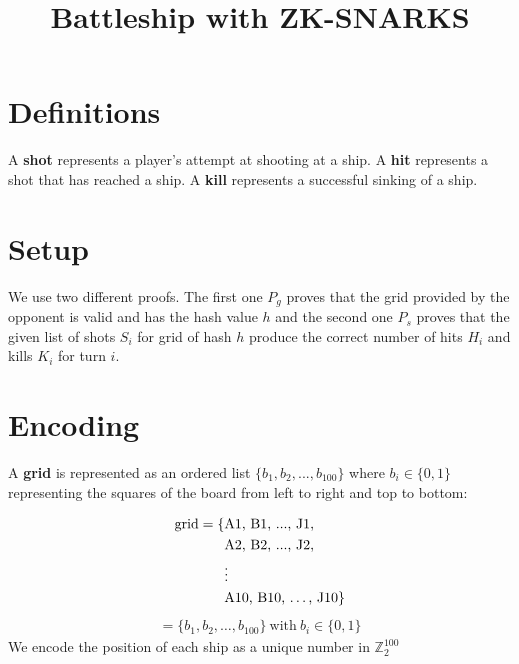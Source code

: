 \documentclass{article}
\title{Battleship with ZK-SNARKS}
\begin{document}
\maketitle
\section{Definitions}
A \textbf{shot} represents a player's attempt at shooting at a ship. A \textbf{hit} represents a shot that has reached a ship. A \textbf{kill} represents a successful sinking of a ship.
\section{Setup}
We use two different proofs. The first one $P_g$ proves that the grid provided by the opponent is valid and has the hash value $h$ and the second one $P_s$ proves that the given list of shots $S_i$ for grid of hash $h$ produce the correct number of hits $H_i$ and kills $K_i$ for turn $i$.
\section{Encoding}
A \textbf{grid} is represented as an ordered list $\{b_1, b_2, ..., b_{100}\}$ where $b_i \in \{0,1\}$ representing the squares of the board from left to right and top to bottom: 

  \begin{align*}
\textrm{grid} = \{ & \textrm{A1, B1, ..., J1,} \\
                   & \textrm{A2, B2, ..., J2,} \\
                   & \vdots \\
                   & \textrm{A10, B10, \dots, J10}\}
  \end{align*}
  \begin{align*}
             = \{b_1, b_2, \dots, b_{100}\}\ \textrm{with}\ b_i \in \{0,1\}
  \end{align*}
We encode the position of each ship as a unique number in $\mathbb{Z}_2^{100}$
\end{document}
